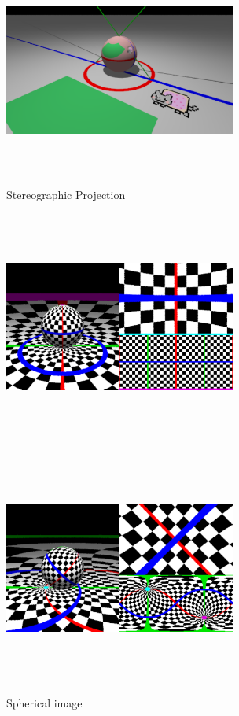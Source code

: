 \begin{figure}[htbp]
 \center
 \includegraphics[width=3in, height=3in, keepaspectratio]{../img/klein/stereoProject.pdf}
 \caption{Stereographic Projection}
 \label{fig:stereoProject}
\end{figure}

\begin{figure}[htbp]
 \begin{minipage}{0.5\hsize}
  \center
  \includegraphics[width=3in, height=3in, keepaspectratio]{../img/klein/spherical.pdf}
  \label{fig:sphericalStandard}
 \end{minipage}
 \begin{minipage}{0.5\hsize}
  \center
  \includegraphics[width=3in, height=3in, keepaspectratio]{../img/klein/sphericalRotation.pdf}
  \label{fig:sphericalRotation}
 \end{minipage}
 \caption{Spherical image}
 \label{fig:spherical}
\end{figure}


